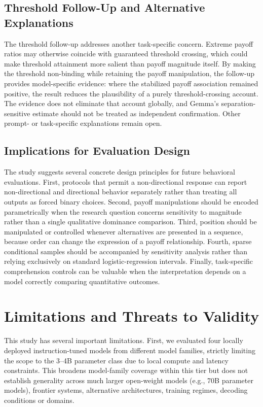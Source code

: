 \documentclass[10pt,journal,compsoc]{IEEEtran}
\begin{document}
\subsection{Threshold Follow-Up and Alternative Explanations}
The threshold follow-up addresses another task-specific concern. Extreme payoff ratios may otherwise coincide with guaranteed threshold crossing, which could make threshold attainment more salient than payoff magnitude itself. By making the threshold non-binding while retaining the payoff manipulation, the follow-up provides model-specific evidence: where the stabilized payoff association remained positive, the result reduces the plausibility of a purely threshold-crossing account. The evidence does not eliminate that account globally, and Gemma's separation-sensitive estimate should not be treated as independent confirmation. Other prompt- or task-specific explanations remain open.

\subsection{Implications for Evaluation Design}
The study suggests several concrete design principles for future behavioral evaluations. First, protocols that permit a non-directional response can report non-directional and directional behavior separately rather than treating all outputs as forced binary choices. Second, payoff manipulations should be encoded parametrically when the research question concerns sensitivity to magnitude rather than a single qualitative dominance comparison. Third, position should be manipulated or controlled whenever alternatives are presented in a sequence, because order can change the expression of a payoff relationship. Fourth, sparse conditional samples should be accompanied by sensitivity analysis rather than relying exclusively on standard logistic-regression intervals. Finally, task-specific comprehension controls can be valuable when the interpretation depends on a model correctly comparing quantitative outcomes.

\section{Limitations and Threats to Validity}
\label{sec:limitations}

This study has several important limitations. First, we evaluated four locally deployed instruction-tuned models from different model families, strictly limiting the scope to the 3--4B parameter class due to local compute and latency constraints. This broadens model-family coverage within this tier but does not establish generality across much larger open-weight models (e.g., 70B parameter models), frontier systems, alternative architectures, training regimes, decoding conditions or domains.
\end{document}
